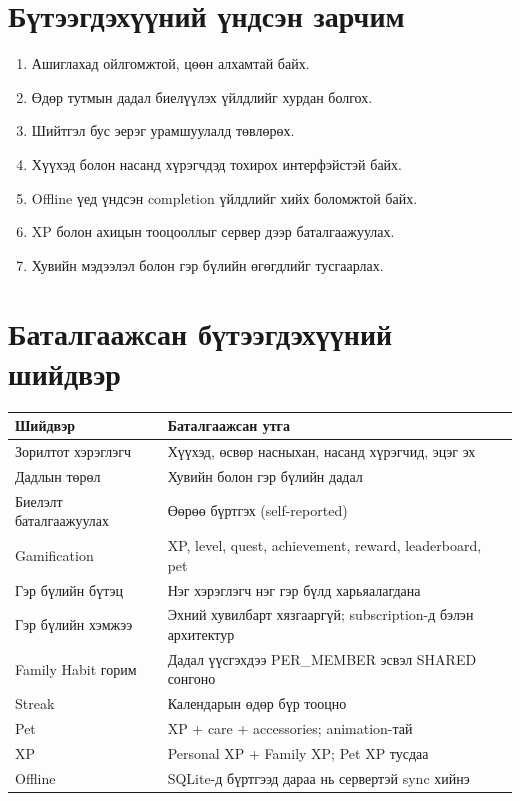\documentclass[12pt,a4paper,oneside]{report}
\begin{document}
\section{Бүтээгдэхүүний үндсэн зарчим}
\begin{enumerate}
  \item Ашиглахад ойлгомжтой, цөөн алхамтай байх.
  \item Өдөр тутмын дадал биелүүлэх үйлдлийг хурдан болгох.
  \item Шийтгэл бус эерэг урамшуулалд төвлөрөх.
  \item Хүүхэд болон насанд хүрэгчдэд тохирох интерфэйстэй байх.
  \item Offline үед үндсэн completion үйлдлийг хийх боломжтой байх.
  \item XP болон ахицын тооцооллыг сервер дээр баталгаажуулах.
  \item Хувийн мэдээлэл болон гэр бүлийн өгөгдлийг тусгаарлах.
\end{enumerate}

\section{Баталгаажсан бүтээгдэхүүний шийдвэр}
\begin{longtable}{p{}p{}}
\toprule
\textbf{Шийдвэр} & \textbf{Баталгаажсан утга}\\
\midrule
Зорилтот хэрэглэгч & Хүүхэд, өсвөр насныхан, насанд хүрэгчид, эцэг эх\\
Дадлын төрөл & Хувийн болон гэр бүлийн дадал\\
Биелэлт баталгаажуулах & Өөрөө бүртгэх (self-reported)\\
Gamification & XP, level, quest, achievement, reward, leaderboard, pet\\
Гэр бүлийн бүтэц & Нэг хэрэглэгч нэг гэр бүлд харьяалагдана\\
Гэр бүлийн хэмжээ & Эхний хувилбарт хязгааргүй; subscription-д бэлэн архитектур\\
Family Habit горим & Дадал үүсгэхдээ PER\_MEMBER эсвэл SHARED сонгоно\\
Streak & Календарын өдөр бүр тооцно\\
Pet & XP + care + accessories; animation-тай\\
XP & Personal XP + Family XP; Pet XP тусдаа\\
Offline & SQLite-д бүртгээд дараа нь сервертэй sync хийнэ\\
\bottomrule
\end{longtable}
\end{document}
